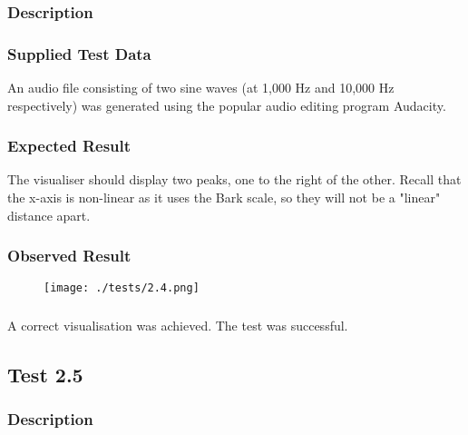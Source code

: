 \subsubsection{Description}
\paragraph{}
{
	\centering
}

\subsubsection{Supplied Test Data}
An audio file consisting of two sine waves (at 1,000 Hz and 10,000 Hz respectively) was generated using the popular audio editing program Audacity.

\subsubsection{Expected Result}
The visualiser should display two peaks, one to the right of the other. Recall that the x-axis is non-linear as it uses the Bark scale, so they will not be a "linear" distance apart.

\subsubsection{Observed Result}
\begin{figure}[H]
	\texttt{[image: ./tests/2.4.png]}
\end{figure}

\subsubsection{}
A correct visualisation was achieved. The test was successful.


\pagebreak
\subsection{Test 2.5}
\subsubsection{Description}
\paragraph{}
{
	\centering
}

